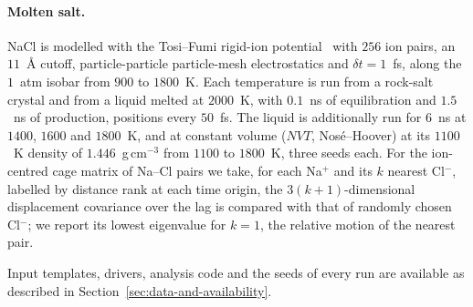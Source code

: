 \paragraph{Molten salt.}
NaCl is modelled with the Tosi--Fumi rigid-ion potential~\cite{fumi1964,tosi1964} with $256$ ion pairs, an $11$~\AA{} cutoff, particle-particle particle-mesh electrostatics and $\delta t = 1$~fs, along the $1$~atm isobar from $900$ to $1800$~K.
Each temperature is run from a rock-salt crystal and from a liquid melted at $2000$~K, with $0.1$~ns of equilibration and $1.5$~ns of production, positions every $50$~fs.
The liquid is additionally run for $6$~ns at $1400$, $1600$ and $1800$~K, and at constant volume ($NVT$, Nos\'e--Hoover) at its $1100$~K density of $1.446$~g\,cm$^{-3}$ from $1100$ to $1800$~K, three seeds each.
For the ion-centred cage matrix of Na--Cl pairs we take, for each Na$^{+}$ and its $k$ nearest Cl$^{-}$, labelled by distance rank at each time origin, the $3(k+1)$-dimensional displacement covariance over the lag is compared with that of randomly chosen Cl$^{-}$; we report its lowest eigenvalue for $k = 1$, the relative motion of the nearest pair.

Input templates, drivers, analysis code and the seeds of every run are available as described in Section~\ref{sec:data-and-availability}.
